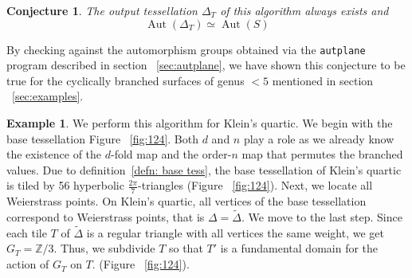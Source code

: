 \documentclass[12pt,reqno]{amsart}
\DeclareMathOperator{\Aut}{Aut}
\newcommand{\Z}{\mathbb{Z}}
\newcommand{\R}{\mathbb{R}}
\newtheorem{conjecture}[theorem]{Conjecture}
\theoremstyle{definition}
\newtheorem{example}[theorem]{Example}
\theoremstyle{remark}
\newcommand{\ti}{\todo[inline]}
\begin{document}
\begin{conjecture} \label{tessconj}
The output tessellation $\Delta_T$ of this algorithm always exists and $$\Aut(\Delta_T) \simeq \Aut(S)$$
\end{conjecture}

By checking against the automorphism groups obtained via the \texttt{autplane} program described in section ~\ref{sec:autplane}, we have shown this conjecture to be true for the cyclically branched surfaces of genus $< 5$ mentioned in section ~\ref{sec:examples}.



\begin{example}
We perform this algorithm for Klein's quartic. We begin with the base tessellation Figure~ \cref{fig:124}. Both $d$ and $n$ play a role as we already know the existence of the $d$-fold map and the order-$n$ map that permutes the branched values. Due to definition~\ref{defn: base tess}, the base tessellation of Klein's quartic is tiled by 56 hyperbolic $\frac{2 \pi}{7}$-triangles (Figure~ \cref{fig:124}). Next, we locate all Weierstrass points. On Klein's quartic, all vertices of the base tessellation correspond to Weierstrass points, that is $\Delta = \widetilde{\Delta}$. We move to the last step. Since each tile $T$ of $\widetilde{\Delta}$ is a regular triangle with all vertices the same weight, we get $G_T = \Z/3$. Thus, we subdivide $T$ so that $T'$ is a fundamental domain for the action of $G_T$ on $T$. (Figure~ \cref{fig:124}).

\end{example}


\end{document}
